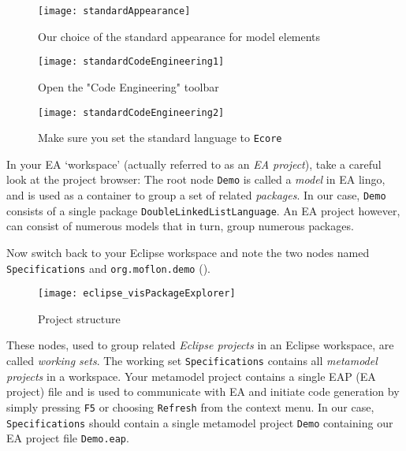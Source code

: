 \begin{figure}[htbp]
  \centering
  \texttt{[image: standardAppearance]}
  \caption{Our choice of the standard appearance for model elements}
  \label{ea:standardAppearanceEA}
\end{figure}

\begin{figure}[htbp]
    \centering
    \texttt{[image: standardCodeEngineering1]}
    \caption{Open the "Code Engineering" toolbar}
    \label{ea:standardSCEEA1}
 \end{figure}

\begin{figure}[htbp]
    \centering
    \texttt{[image: standardCodeEngineering2]}
    \caption{Make sure you set the standard language to \texttt{Ecore}}
    \label{ea:standardSCEEA2}
 \end{figure}
 
\clearpage

In your EA `workspace' (actually referred to as an \emph{EA project}), take a careful  look at the project browser:  The root node \texttt{Demo} is called a
\emph{model} in EA lingo, and is used as a container to group a set of related \emph{packages}. In our case, \texttt{Demo}  consists of a single package
\texttt{DoubleLinkedListLanguage}. An EA project however, can consist of numerous models that in turn, group numerous packages.

Now switch back to your Eclipse workspace and note the two nodes named \texttt{Spe\-ci\-fi\-ca\-tions} and \texttt{org.moflon.demo} ().

\begin{figure}[htbp]
    \centering
    \texttt{[image: eclipse\_visPackageExplorer]}
    \caption{Project structure}
    \label{eclipse:eclipsePS}
 \end{figure}

These nodes, used to group related \emph{Eclipse projects} in an Eclipse workspace, are called \emph{working sets}. The working set
\texttt{Spe\-ci\-fi\-ca\-tions} contains all \emph{metamodel projects} in a  workspace. Your metamodel project contains a single EAP (EA project) file and is
used to communicate with EA and initiate code generation by simply pressing \texttt{F5} or choosing \texttt{Refresh} from the context menu. In our case,
\texttt{Specifications} should contain a single metamodel project \texttt{Demo} containing our EA project file  \texttt{Demo.eap}.
 

